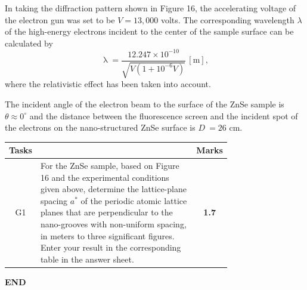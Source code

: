 In taking the diffraction pattern shown in Figure 16, the accelerating voltage of the electron gun was set to be $V = 13{,}000$ volts. The corresponding wavelength $\lambda$ of the high-energy electrons incident to the center of the sample surface can be calculated by
\begin{equation}
\uplambda{=}\frac{12.247\times10^{-10}}{\sqrt{V(1{+}10^{-6}V)}}\,[\mathrm{m}], \tag{6}
\end{equation}
where the relativistic effect has been taken into account.

The incident angle of the electron beam to the surface of the ZnSe sample is $\theta \approx 0^{\circ}$ and the distance between the fluorescence screen and the incident spot of the electrons on the nano-structured ZnSe surface is $D\ = 26$ cm.

\noindent\begin{tabular}{|c|p{0.74\linewidth}|c|}
\hline
\textbf{Tasks} & & \textbf{Marks} \\ \hline
G1 & For the ZnSe sample, based on Figure 16 and the experimental conditions given above, determine the lattice-plane spacing $a^{*}$ of the periodic atomic lattice planes that are perpendicular to the nano-grooves with non-uniform spacing, in meters to three significant figures. Enter your result in the corresponding table in the answer sheet. & \textbf{1.7} \\ \hline
\end{tabular}

\begin{center}\textbf{END}\end{center}
